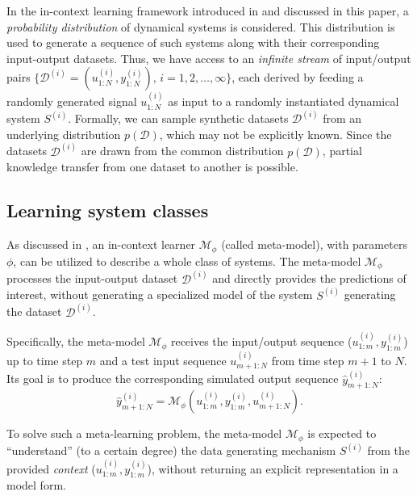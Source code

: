 \documentclass{ifacconf}
\newcommand{\sys}{S}
\newcommand{\free}{\mathcal{M}}
\newcommand{\D}{\mathcal{D}}
\begin{document}
In the in-context learning framework introduced in \citet{forgione2023context} and discussed in this paper, a \emph{probability  distribution} of dynamical systems is considered. This distribution is used to generate a sequence of such systems along with their corresponding input-output datasets. Thus, we have access to an \emph{infinite stream} of input/output pairs 
$ \{ \mathcal{D}^{(i)} = (u_{1:N}^{(i)}, y_{1:N}^{(i)}), \, i=1,2,\dots, \infty \} $, 
each derived by feeding a randomly generated signal $ u_{1:N}^{(i)}$ as input to a randomly instantiated dynamical system $\sys^{(i)}$. Formally, we can sample synthetic datasets $ \mathcal{D}^{(i)} $ from an underlying distribution $p(\mathcal{D})$, which may not be explicitly known. Since the datasets $\D^{(i)}$ are drawn from the common distribution $p(\D)$, partial knowledge transfer from one dataset to another is possible.


\subsection{Learning system classes}

As discussed in \citet{forgione2023context}, an in-context learner  $\free_{\phi}$ (called meta-model), with parameters $\phi$, can be utilized to describe a whole class of systems. The meta-model $\free_{\phi}$   processes  the input-output dataset $\D^{(i)}$ and directly provides the predictions of interest, without generating a  specialized  model of the system $\sys^{(i)}$ generating the dataset $\D^{(i)}$.

Specifically,  the meta-model $\free_{\phi}$ receives the input/output sequence ($u_{1:m}^{(i)}, y_{1:m}^{(i)}$) up to time step $m$
and a test input sequence $u_{m+1:N}^{(i)}$ from time step $m+1$ to $N$. Its goal is to produce the corresponding simulated output sequence 
$\hat y_{m+1:N}^{(i)}$: 
\begin{equation}
\label{eq:model_free_sim}
\hat y_{m+1:N}^{(i)} = \free_\phi(u_{1:m}^{(i)}, y_{1:m}^{(i)}, u_{m+1:N}^{(i)}).
\end{equation}


 To solve such a meta-learning problem,  the meta-model $ \free_\phi$ is expected to ``understand'' (to a certain degree) the data generating mechanism $\sys^{(i)}$ from the provided \emph{context}   ($u_{1:m}^{(i)}, y_{1:m}^{(i)}$), without returning an explicit representation in a model form. 
\end{document}
